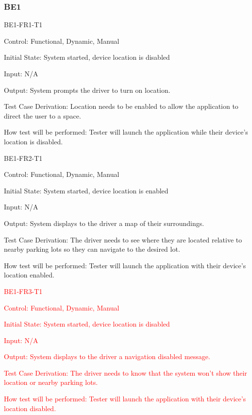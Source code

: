 \documentclass[12pt, titlepage]{article}
\begin{document}
\subsubsection{BE1}

\begin{enumerate}

\item{BE1-FR1-T1}

Control: Functional, Dynamic, Manual
					
Initial State: System started, device location is disabled
					
Input: N/A
					
Output: System prompts the driver to turn on location.

Test Case Derivation: Location needs to be enabled to allow the application to
direct the user to a space.
					
How test will be performed: Tester will launch the application while their
device's location is disabled.
					
\item{BE1-FR2-T1}

Control: Functional, Dynamic, Manual
					
Initial State: System started, device location is enabled
					
Input: N/A
					
Output: System displays to the driver a map of their surroundings.

Test Case Derivation: The driver needs to see where they are located relative to
nearby parking lots so they can navigate to the desired lot.

How test will be performed: Tester will launch the application with their
device's location enabled.

\textcolor{red}{\item{BE1-FR3-T1}}

\textcolor{red}{Control: Functional, Dynamic, Manual}

\textcolor{red}{Initial State: System started, device location is disabled}
					
\textcolor{red}{Input: N/A}
					
\textcolor{red}{Output: System displays to the driver a navigation disabled message.}

\textcolor{red}{Test Case Derivation: The driver needs to know that the system won't show their location or nearby parking lots.}

\textcolor{red}{How test will be performed: Tester will launch the application
with their device's location disabled.}

\end{enumerate}
\end{document}
